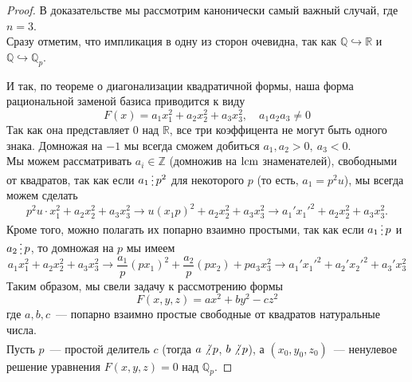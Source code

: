 \documentclass[11pt]{report}
\begin{document}
    \begin{proof}
        В доказательстве мы рассмотрим канонически самый важный случай, где $n = 3$. \\
        Сразу отметим, что импликация в одну из сторон очевидна, так как $\mathbb{Q} \hookrightarrow \mathbb{R}$ и $\mathbb{Q} \hookrightarrow \mathbb{Q}_p$.

         И так, по теореме о диагонализации квадратичной формы, наша форма рациональной заменой базиса приводится к виду
        \[ F(x) = a_1 x_1^2 + a_2 x_2^2 + a_3 x_3^2, \quad a_1 a_2 a_3 \neq 0 \]
        Так как она представляет 0 над $\mathbb{R}$, все три коэффицента не могут быть одного знака. Домножая на $-1$ мы всегда сможем
        добиться $a_1, a_2 > 0, \ a_3 < 0$. \\

        Мы можем рассматривать $a_i \in \mathbb{Z}$ (домножив на $\operatorname{lcm}$ знаменателей), свободными от квадратов, так как если
        $a_1 \divisible p^2$ для некоторого $p$ (то есть, $a_1 = p^2 u$), мы всегда можем сделать
        \[  p^2 u \cdot x_1^2 + a_2 x_2^2 + a_3 x_3^2 \to u (x_1 p)^2 + a_2 x_2^2 + a_3 x_3^2 \to a_1' x_1'^2 + a_2 x_2^2 + a_3 x_3^2. \]
        Кроме того, можно полагать их попарно взаимно простыми, так как если $a_1 \divisible p$ и $a_2 \divisible p$, то домножая на $p$  мы имеем
        \[a_1 x_1^2 + a_2 x_2^2 + a_3 x_3^2 \to \frac{a_1}{p}(p x_1)^2 + \frac{a_2}{p} (p x_2) + pa_3 x_3^2 \to a_1' x_1'^2 + a_2' x_2'^2 + a_3' x_3^2\]
        Таким образом, мы свели задачу к рассмотрению формы
        \[ F(x, y, z) = ax^2 + by^2 - cz^2 \]
        где $a, b, c$~--- попарно взаимно простые свободные от квадратов натуральные числа.\\

        Пусть $p$~--- простой делитель $c$ (тогда $a \not\divisible p$, $b \not\divisible p$), а $(x_0, y_0, z_0)$~--- ненулевое решение
        уравнения $F(x, y, z) = 0$ над $\mathbb{Q}_p$.


\end{proof}
\end{document}
